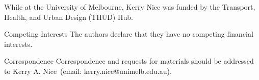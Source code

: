 \documentclass{nature}
\begin{document}







\begin{addendum}
 \item While at the University of Melbourne, Kerry Nice was funded by the Transport, Health, and Urban Design (THUD) Hub.
 \item[Competing Interests] The authors declare that they have no
competing financial interests.
 \item[Correspondence] Correspondence and requests for materials
should be addressed to Kerry A. Nice~(email: kerry.nice@unimelb.edu.au).
\end{addendum}


\end{document}

